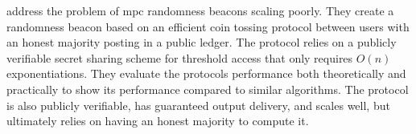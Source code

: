 \item [SCRAPE: Scalable Randomness Attested by Public Entities]
\citet*{cascudo2017scrape} address the problem of \gls{mpc} randomness beacons scaling poorly. They create a randomness beacon based on an efficient coin tossing protocol between users with an honest majority posting in a public ledger. The protocol relies on a publicly verifiable secret sharing scheme for threshold access that only requires $O(n)$ exponentiations. They evaluate the protocols performance both theoretically and practically to show its performance compared to similar algorithms. The protocol is also publicly verifiable, has guaranteed output delivery, and scales well, but ultimately relies on having an honest majority to compute it. 